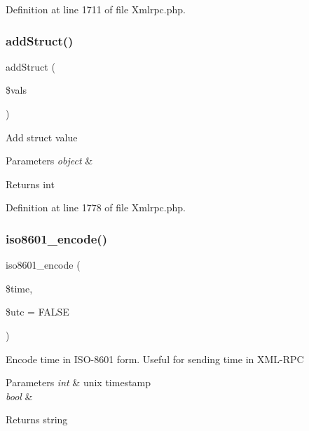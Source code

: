 Definition at line 1711 of file Xmlrpc.\+php.

\mbox{\label{class_x_m_l___r_p_c___values_a5dbdf0121566791a201cd07a3de15531}} 
\subsubsection{\texorpdfstring{addStruct()}{addStruct()}}
{\footnotesize\ttfamily add\+Struct (\begin{DoxyParamCaption}\item[{}]{\$vals }\end{DoxyParamCaption})}

Add struct value


\begin{DoxyParams}{Parameters}
{\em object} & \\
\hline
\end{DoxyParams}
\begin{DoxyReturn}{Returns}
int 
\end{DoxyReturn}


Definition at line 1778 of file Xmlrpc.\+php.

\mbox{\label{class_x_m_l___r_p_c___values_a201f99ae311bb2c53526933576c890d0}} 
\subsubsection{\texorpdfstring{iso8601\_encode()}{iso8601\_encode()}}
{\footnotesize\ttfamily iso8601\+\_\+encode (\begin{DoxyParamCaption}\item[{}]{\$time,  }\item[{}]{\$utc = {\ttfamily FALSE} }\end{DoxyParamCaption})}

Encode time in I\+S\+O-\/8601 form. Useful for sending time in X\+M\+L-\/\+R\+PC


\begin{DoxyParams}{Parameters}
{\em int} & unix timestamp \\
\hline
{\em bool} & \\
\hline
\end{DoxyParams}
\begin{DoxyReturn}{Returns}
string 
\end{DoxyReturn}


